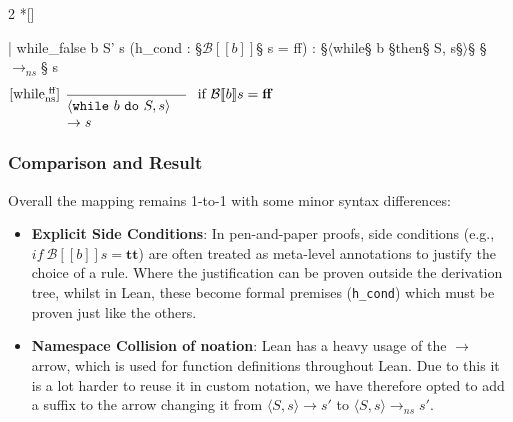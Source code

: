 \begin{paracol}{2}
\switchcolumn[1]*[]
\begin{leftcolumn}
    \begin{Lean_Code}
  | while_false {b S' s}
    (h_cond : §\(\mathcal{B}[\![b]\!]\)§ s = ff) :
      §\(\langle\)while§ b §then§ S, s§\(\rangle\)§
      §\(\to_{ns}\)§ s
    \end{Lean_Code}
\end{leftcolumn}
\begin{rightcolumn}
    \vspace{2.5em}
    \(
\begin{prooftree}
  \hypo{} %
  \infer[
    left label={[while$_{\text{ns}}^{\text{\ ff}}$]}
    ]1[
    if $\mathcal{B}[\![b]\!]s = \mathbf{ff}$
    ]{
        \parbox{3cm}{$
    \langle \mathtt{while}\ b\ \mathtt{do}\ S, s \rangle \\
    \to s
        $}
    }
\end{prooftree}
    \)
\end{rightcolumn}
\end{paracol}
\vspace{1em}

\subsubsection*{Comparison and Result}
Overall the mapping remains 1-to-1 with some minor syntax differences:

\begin{itemize}
    
    \item \textbf{Explicit Side Conditions}:
    In pen-and-paper proofs, side conditions (e.g.,
    $if \ \mathcal{B}[\![b]\!]s = \mathbf{tt}$) are often treated as meta-level
    annotations to justify the choice of a rule. Where the justification can be proven outside the derivation tree,
    whilst in Lean, these become formal premises (\texttt{h\_cond}) which must
    be proven just like the others.

    \item \textbf{Namespace Collision of noation}:
    Lean has a heavy usage of the \(\to\) arrow, which is used for function definitions throughout Lean.
    Due to this it is a lot harder to reuse it in custom notation, we have therefore opted to add a suffix to the arrow
    changing it from \(\langle S , s \rangle \to s'\) to \(\langle S , s \rangle \to_{ns} s'\).
\end{itemize}

\noindent

